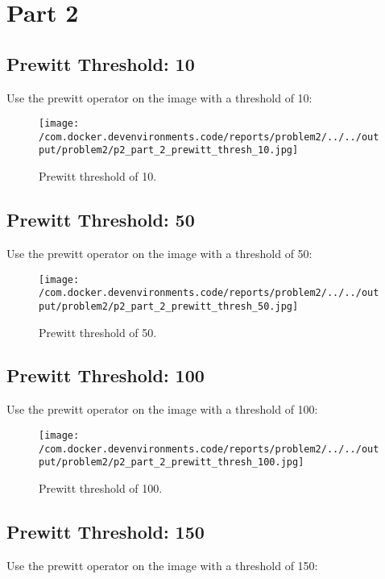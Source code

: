 \documentclass{article}%
\begin{document}
%
\newpage

%
\section{Part 2}%
\label{sec:Part2}%
\subsection{Prewitt Threshold: 10}%
\label{subsec:PrewittThreshold10}%
Use the prewitt operator on the image with a threshold of 10:%


\begin{figure}[h!]%
\centering%
\texttt{[image: /com.docker.devenvironments.code/reports/problem2/../../output/problem2/p2\_part\_2\_prewitt\_thresh\_10.jpg]}%
\caption{Prewitt threshold of 10.}%
\end{figure}

%
\subsection{Prewitt Threshold: 50}%
\label{subsec:PrewittThreshold50}%
Use the prewitt operator on the image with a threshold of 50:%


\begin{figure}[h!]%
\centering%
\texttt{[image: /com.docker.devenvironments.code/reports/problem2/../../output/problem2/p2\_part\_2\_prewitt\_thresh\_50.jpg]}%
\caption{Prewitt threshold of 50.}%
\end{figure}

%
\subsection{Prewitt Threshold: 100}%
\label{subsec:PrewittThreshold100}%
Use the prewitt operator on the image with a threshold of 100:%


\begin{figure}[h!]%
\centering%
\texttt{[image: /com.docker.devenvironments.code/reports/problem2/../../output/problem2/p2\_part\_2\_prewitt\_thresh\_100.jpg]}%
\caption{Prewitt threshold of 100.}%
\end{figure}

%
\newpage%
\subsection{Prewitt Threshold: 150}%
\label{subsec:PrewittThreshold150}%
Use the prewitt operator on the image with a threshold of 150:%
\end{document}
